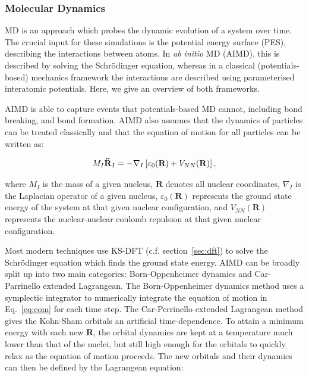 \documentclass[../main.tex]{subfiles}
\begin{document}
\subsubsection{Molecular Dynamics}
\label{sec:molecular_dynamics}
MD is an approach which probes the dynamic evolution of a system over time. The crucial input for these simulations is the potential energy surface (PES), describing the interactions between atoms. In \textit{ab initio} MD (AIMD), this is described by solving the Schr\"{o}dinger equation, whereas in a classical (potentials-based) mechanics framework the interactions are described using parameterised interatomic potentials. Here, we give an overview of both frameworks.

AIMD is able to capture events that potentials-based MD cannot, including bond breaking, and bond formation. AIMD also assumes that the dynamics of particles can be treated classically and that the equation of motion for all particles can be written as:

\begin{equation}
    \label{eq:eom}
    M_I \textrm{\textbf{\"{R}}} _I=-\nabla_I\left[ \varepsilon_0(\textbf{R})+V_{NN}(\mathbf{R})\right],
\end{equation}

where $M_I$ is the mass of a given nucleus, $\textbf{R}$ denotes all nuclear coordinates, $\nabla_I$ is the Laplacian operator of a given nucleus, $\varepsilon_0(\textbf{R})$ represents the ground state energy of the system at that given nuclear configuration, and $V_{NN}(\textbf{R})$ represents the nuclear-nuclear coulomb repulsion at that given nuclear configuration.

Most modern techniques use KS-DFT (c.f. section~\ref{sec:dft}) to solve the Schr\"{o}dinger equation which finds the ground state energy. AIMD can be broadly split up into two main categories: Born-Oppenheimer dynamics and Car-Parrinello extended Lagrangean. The Born-Oppenheimer dynamics method uses a symplectic integrator to numerically integrate the equation of motion in Eq.~\ref{eq:eom} for each time step. The Car-Perrinello extended Lagrangean method gives the Kohn-Sham orbitals an artificial time-dependence. To attain a minimum energy with each new $\textbf{R}$, the orbital dynamics are kept at a temperature much lower than that of the nuclei, but still high enough for the orbitals to quickly relax as the equation of motion proceeds. The new orbitals and their dynamics can then be defined by the Lagrangean equation:\cite{Car1985}
\end{document}
